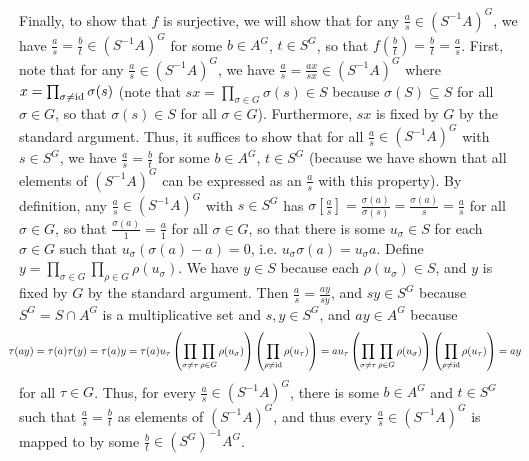 \documentclass[11pt]{article}
\begin{document}
Finally, to show that $f$ is surjective, we will show that for any $\frac{a}{s}\in (S^{-1}A)^G$, we have $\frac{a}{s}=\frac{b}{t}\in (S^{-1}A)^G$ for some $b\in A^G$, $t\in S^G$, so that $f(\frac{b}{t})=\frac{b}{t}=\frac{a}{s}$. First, note that for any $\frac{a}{s}\in (S^{-1}A)^G$, we have $\frac{a}{s}=\frac{ax}{sx}\in (S^{-1}A)^G$ where $x=\prod_{\sigma\neq\operatorname{id}}\sigma(s)$ (note that $sx=\prod_{\sigma\in G}\sigma(s)\in S$ because $\sigma(S)\subseteq S$ for all $\sigma\in G$, so that $\sigma(s)\in S$ for all $\sigma\in G$). Furthermore, $sx$ is fixed by $G$ by the standard argument. Thus, it suffices to show that for all $\frac{a}{s}\in (S^{-1}A)^G$ with $s\in S^G$, we have $\frac{a}{s}=\frac{b}{t}$ for some $b\in A^G$, $t\in S^G$ (because we have shown that all elements of $(S^{-1}A)^G$ can be expressed as an $\frac{a}{s}$ with this property). By definition, any $\frac{a}{s}\in (S^{-1}A)^G$ with $s\in S^G$ has $\sigma[\frac{a}{s}]=\frac{\sigma(a)}{\sigma(s)}=\frac{\sigma(a)}{s}=\frac{a}{s}$ for all $\sigma\in G$, so that $\frac{\sigma(a)}{1}=\frac{a}{1}$ for all $\sigma\in G$, so that there is some $u_\sigma\in S$ for each $\sigma\in G$ such that $u_\sigma(\sigma(a)-a)=0$, i.e. $u_\sigma\sigma(a)=u_\sigma a$. Define $y=\prod_{\sigma\in G}\prod_{\rho\in G}\rho(u_\sigma)$. We have $y\in S$ because each $\rho(u_\sigma)\in S$, and $y$ is fixed by $G$ by the standard argument. Then $\frac{a}{s}=\frac{ay}{sy}$, and $sy\in S^G$ because $S^G=S\cap A^G$ is a multiplicative set and $s,y\in S^G$, and $ay\in A^G$ because \[\hskip-0.15in\tau(ay)=\tau(a)\tau(y)=\tau(a)y=\tau(a)u_\tau\left(\prod_{\sigma\neq\tau}\prod_{\rho\in G}\rho(u_\sigma)\right)\left(\prod_{\rho\neq\id}\rho(u_\tau)\right)=au_\tau\left(\prod_{\sigma\neq\tau}\prod_{\rho\in G}\rho(u_\sigma)\right)\left(\prod_{\rho\neq\id}\rho(u_\tau)\right)=ay\]
for all $\tau\in G$. Thus, for every $\frac{a}{s}\in (S^{-1}A)^G$, there is some $b\in A^G$ and $t\in S^G$ such that $\frac{a}{s}=\frac{b}{t}$ as elements of $(S^{-1}A)^G$, and thus every $\frac{a}{s}\in (S^{-1}A)^G$ is mapped to by some $\frac{b}{t}\in(S^G)^{-1}A^G$.\\  

\pagebreak
\end{document}
